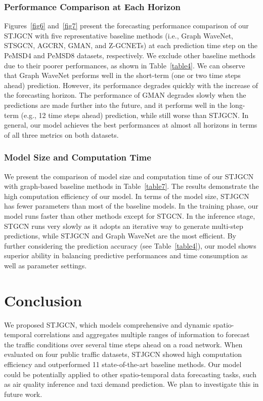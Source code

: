 \documentclass[10pt,journal,compsoc]{IEEEtran}
\begin{document}
\subsubsection{Performance Comparison at Each Horizon}

Figures~\ref{fig6} and~\ref{fig7} present the forecasting performance comparison of our STJGCN with five representative baseline methods (i.e., Graph WaveNet, STSGCN, AGCRN, GMAN, and Z-GCNETs) at each prediction time step on the PeMSD4 and PeMSD8 datasets, respectively. We exclude other baseline methods due to their poorer performances, as shown in Table~\ref{table4}. We can observe that Graph WaveNet performs well in the short-term (one or two time steps ahead) prediction. However, its performance degrades quickly with the increase of the forecasting horizon. The performance of GMAN degrades slowly when the predictions are made further into the future, and it performs well in the long-term (e.g., 12 time steps ahead) prediction, while still worse than STJGCN. In general, our model achieves the best performances at almost all horizons in terms of all three metrics on both datasets. 

\subsubsection{Model Size and Computation Time} \label{section4.3.5}

We present the comparison of model size and computation time of our STJGCN with graph-based baseline methods in Table~\ref{table7}. The results demonstrate the high computation efficiency of our model. In terms of the model size, STJGCN has fewer parameters than most of the baseline models. In the training phase, our model runs faster than other methods except for STGCN. In the inference stage, STGCN runs very slowly as it adopts an iterative way to generate multi-step predictions, while STJGCN and Graph WaveNet are the most efficient. By further considering the prediction accuracy (see Table~\ref{table4}), our model shows superior ability in balancing predictive performances and time consumption as well as parameter settings.

\section{Conclusion} \label{Conclusion}

We proposed STJGCN, which models comprehensive and dynamic spatio-temporal correlations and aggregates multiple ranges of information to forecast the traffic conditions over several time steps ahead on a road network. When evaluated on four public traffic datasets, STJGCN showed high computation efficiency and outperformed 11 state-of-the-art baseline methods. Our model could be potentially applied to other spatio-temporal data forecasting tasks, such as air quality inference and taxi demand prediction. We plan to investigate this in future work. 
\end{document}
